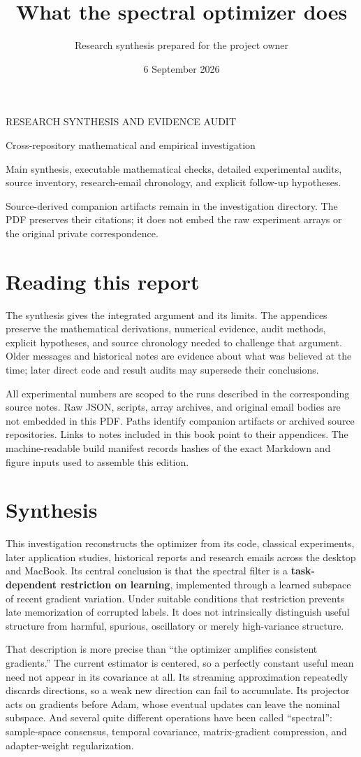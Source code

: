 \documentclass[
  british,
  10pt,
  a4paper,
]{article}
\title{What the spectral optimizer does}
\author{Research synthesis prepared for the project owner}
\date{6 September 2026}
\makeatletter
\renewcommand{\maketitle}{%
  \hypersetup{pageanchor=false}%
  \begin{titlepage}\thispagestyle{empty}
  \vspace*{1.2cm}
  {\large\sffamily\color{reportteal}RESEARCH SYNTHESIS AND EVIDENCE AUDIT\par}
  \vspace{1.0cm}
  {\Huge\bfseries\color{reportink}\@title\par}
  \vspace{.8cm}
  {\Large Cross-repository mathematical and empirical investigation\par}
  \vspace{1.0cm}
  {\large\@author\par}
  \vspace{.35cm}
  {\large\@date\par}
  \vfill
  {\normalsize Main synthesis, executable mathematical checks, detailed
  experimental audits, source inventory, research-email chronology, and
  explicit follow-up hypotheses.\par}
  \vspace{.7cm}
  {\small Source-derived companion artifacts remain in the investigation
  directory. The PDF preserves their citations; it does not embed the raw
  experiment arrays or the original private correspondence.\par}
  \vspace*{.8cm}
  \end{titlepage}%
  \hypersetup{pageanchor=true}%
}
\makeatother
\begin{document}
\maketitle

{
\setcounter{tocdepth}{2}
\tableofcontents
}
\clearpage

\section*{Reading this report}\label{reading-this-report}

The synthesis gives the integrated argument and its limits. The
appendices preserve the mathematical derivations,\allowbreak{} numerical
evidence, audit methods, explicit hypotheses,\allowbreak{} and source
chronology needed to challenge that argument. Older messages and
historical notes are evidence about what was believed at the time; later
direct code and result audits may supersede their
conclusions.\allowbreak{}

All experimental numbers are scoped to the runs described in the
corresponding source notes. Raw JSON, scripts, array archives, and
original email bodies are not embedded in this PDF. Paths identify
companion artifacts or archived source
repositories\allowbreak{}.\allowbreak{} Links to notes included in this
book point to their appendices.\allowbreak{} The
machine-\allowbreak{}readable build manifest records hashes of the exact
Markdown and figure inputs used to assemble this edition.

\clearpage

\section{Synthesis}\label{synthesis}

This investigation reconstructs the optimizer from its code, classical
experiments,\allowbreak{} later application studies, historical reports
and research emails across the desktop and MacBook. Its central
conclusion is that the spectral filter is a
\textbf{task-\allowbreak{}dependent restriction on learning},
implemented through a learned subspace of recent gradient variation.
Under suitable conditions that restriction prevents late memorization of
corrupted labels. It does not intrinsically distinguish useful structure
from harmful, spurious, oscillatory or merely high-\allowbreak{}variance
structure.

That description is more precise than ``the optimizer amplifies
consistent gradients.\allowbreak{}” The current estimator is centered,
so a perfectly constant useful mean need not appear in its covariance at
all. Its streaming approximation repeatedly discards
directions,\allowbreak{} so a weak new direction can fail to
accumulate.\allowbreak{} Its projector acts on gradients before Adam,
whose eventual updates can leave the nominal subspace. And several quite
different operations have been called ``spectral'':
sample-\allowbreak{}space consensus, temporal covariance,\allowbreak{}
matrix-\allowbreak{}gradient compression,\allowbreak{} and
adapter-\allowbreak{}weight regularizati\allowbreak{}on.\allowbreak{}
\end{document}
